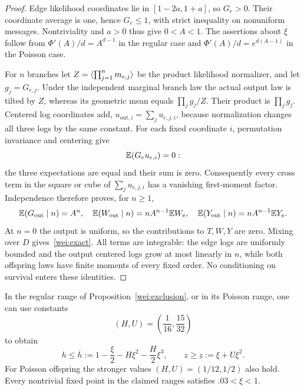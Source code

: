 \begin{proof}
Edge likelihood coordinates lie in $[1-2a,1+a]$, so $G_e>0$.
Their coordinate average is one, hence $G_e\le1$, with strict inequality
on nonuniform messages.  Nontriviality and $a>0$ thus give $0<A<1$.
The assertions about $\xi$ follow from
$\Phi'(A)/d=A^{d-1}$ in the regular case and
$\Phi'(A)/d=e^{d(A-1)}$ in the Poisson case.

For $n$ branches let $Z=\langle \prod_{j=1}^n m_{e,j}\rangle$ be the
product likelihood normalizer, and let $g_j=G_{e,j}$.
Under the independent marginal branch law the actual output law is
tilted by $Z$, whereas its geometric mean equals $\prod_jg_j/Z$.
Their product is $\prod_jg_j$.  Centered log coordinates add,
$u_{\mathrm{out},i}=\sum_j u_{e,j,i}$, because normalization changes
all three logs by the same constant.
For each fixed coordinate $i$, permutation invariance and centering
give
\[
 \mathbb E(G_e u_{e,i})=0:
\]
the three expectations are equal and their sum is zero.
Consequently every cross term in the square or cube of
$\sum_j u_{e,j,i}$ has a vanishing first-moment factor.
Independence therefore proves, for $n\ge1$,
\[
 \mathbb E(G_{\mathrm{out}}\mid n)=A^n,\quad
 \mathbb E(W_{\mathrm{out}}\mid n)=nA^{n-1}\mathbb E W_e,\quad
 \mathbb E(Y_{\mathrm{out}}\mid n)=nA^{n-1}\mathbb E Y_e.
\]
At $n=0$ the output is uniform, so the contributions to $T,W,Y$ are
zero.  Mixing over $D$ gives~\eqref{wei:exact}.
All terms are integrable: the edge logs are uniformly bounded and the
output centered logs grow at most linearly in $n$, while both offspring
laws have finite moments of every fixed order.  No conditioning on
survival enters these identities.
\end{proof}

\begin{lemma}\label{wei:scalarbounds}
In the regular range of Proposition~\ref{wei:exclusion}, or in its
Poisson range, one can use constants
\[
 (H,U)=\left(\frac1{16},\frac{15}{32}\right)
\]
to obtain
\begin{equation}\label{wei:hz}
 h\le\overline h:=1-\frac\xi2-H\xi^2-\frac H2\xi^3,
 \qquad z\ge\underline z:=\xi+U\xi^2.
\end{equation}
For Poisson offspring the stronger values
$(H,U)=(1/12,1/2)$ also hold.  Every nontrivial fixed point in the
claimed ranges satisfies $.03<\xi<1$.
\end{lemma}

